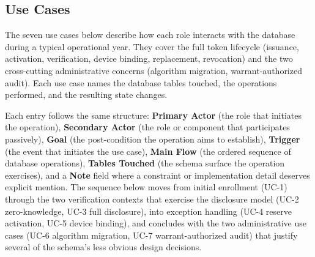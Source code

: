 \documentclass[11pt,letterpaper]{article}
\begin{document}
\subsection{Use Cases}

The seven use cases below describe how each role interacts with the database during a typical operational year. They cover the full token lifecycle (issuance, activation, verification, device binding, replacement, revocation) and the two cross-cutting administrative concerns (algorithm migration, warrant-authorized audit). Each use case names the database tables touched, the operations performed, and the resulting state changes.

Each entry follows the same structure: \textbf{Primary Actor} (the role that initiates the operation), \textbf{Secondary Actor} (the role or component that participates passively), \textbf{Goal} (the post-condition the operation aims to establish), \textbf{Trigger} (the event that initiates the use case), \textbf{Main Flow} (the ordered sequence of database operations), \textbf{Tables Touched} (the schema surface the operation exercises), and a \textbf{Note} field where a constraint or implementation detail deserves explicit mention. The sequence below moves from initial enrollment (UC-1) through the two verification contexts that exercise the disclosure model (UC-2 zero-knowledge, UC-3 full disclosure), into exception handling (UC-4 reserve activation, UC-5 device binding), and concludes with the two administrative use cases (UC-6 algorithm migration, UC-7 warrant-authorized audit) that justify several of the schema's less obvious design decisions.
\end{document}
